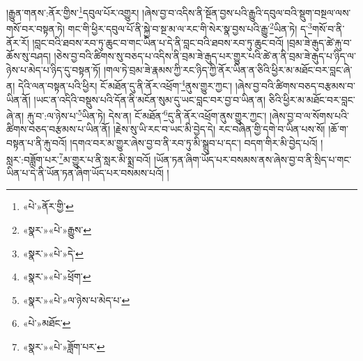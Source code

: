 །རྒྱུན་གནས་:ནོར་གྱིས་\footnote{«པེ་»ནོར་གྱི་}དབུལ་པོར་འགྱུར། །ཞེས་བྱ་བ་འདིས་ནི་སྔོན་བྱས་པའི་རྒྱུའི་དབུལ་བའི་སྡུག་བསྔལ་ལས་གསོ་བར་བསྟན་ཏེ། གང་གི་ཕྱིར་དབུལ་པོ་ནི་སྐྱེ་བ་སྔ་མ་ལ་རང་གི་སེར་སྣ་བྱས་པའི་རྒྱུ་\footnote{«སྣར་»«པེ་»རྒྱུས་}ཡིན་ཏེ། ད་\footnote{«སྣར་»«པེ་»དེ་}གསོ་བ་ནི་ནོར་རོ། །བླང་བའི་ཐབས་རབ་ཏུ་ཆུང་བ་གང་ཡིན་པ་དེ་ནི་བླང་བའི་ཐབས་རབ་ཏུ་ཆུང་བའོ། །བྲམ་ཟེ་རྒུད་ཚེ་རྐུ་བ་ཆོས་སུ་བཤད། །ཅེས་བྱ་བའི་ཚིགས་སུ་བཅད་པ་འདིས་ནི་བྲམ་ཟེ་རྒུད་པར་གྱུར་པའི་ཚེ་ན་ནི་བྲམ་ཟེ་རྒུད་པ་ཉིད་ལ་ཉེས་པ་མེད་པ་ཉིད་དུ་བསྟན་ཏོ། །གལ་ཏེ་བྲམ་ཟེ་རྣམས་ཀྱི་རང་ཉིད་ཀྱི་ནོར་ཡིན་ན་ཅིའི་ཕྱིར་མ་མཐོང་བར་བླང་ཞེ་ན། དེའི་ལན་བསྟན་པའི་ཕྱིར། ངོ་མཐོན་དུ་ནི་ནོར་འཕྲོག་\footnote{«སྣར་»«པེ་»ཕྲོག་}ནུས་གྱུར་ཀྱང་། །ཞེས་བྱ་བའི་ཚིགས་བཅད་བརྩམས་བ་ཡིན་ནོ། །ཡང་ན་འདིའི་བསྡུས་པའི་དོན་ནི་མངོན་སུམ་དུ་ཡང་བླང་བར་བྱ་བ་ཡིན་ན། ཅིའི་ཕྱིར་མ་མཐོང་བར་བླང་ཞེ་ན། རྐུ་བ་:ལ་ཉེས་པ་\footnote{«སྣར་»«པེ་»ལ་ཉེས་པ་མེད་པ་}ཡིན་ཏེ། དེས་ན། ངོ་མཐོན་\footnote{«པེ་»མཐོང་}དུ་ནི་ནོར་འཕྲོག་ནུས་གྱུར་ཀྱང་། །ཞེས་བྱ་བ་ལ་སོགས་པའི་ཚིགས་བཅད་བརྩམས་པ་ཡིན་ནོ། །རྗེས་སུ་ཡི་རང་བ་ཡང་མི་བྱེད་དེ། རང་བཞིན་གྱི་དགེ་བ་ཡིན་པས་སོ། །ཆོ་ག་བསྟན་པ་ནི་རྐུ་བའོ། །དགའ་བར་མ་གྱུར་ཞེས་བྱ་བ་ནི་རབ་ཏུ་མི་སྒྲུབ་པ་དང་། བདག་གིར་མི་བྱེད་པའོ། །སླར་:བཟློག་པར་\footnote{«སྣར་»«པེ་»ཟློག་པར་}མ་གྱུར་པ་ནི་སླར་མི་སྨྲ་བའོ། །ཡོན་ཏན་ཞིག་ཡོད་པར་བསམས་ནས་ཞེས་བྱ་བ་ནི་སྲིད་པ་གང་ཡིན་པ་དེ་ནི་ཡོན་ཏན་ཞིག་ཡོད་པར་བསམས་པའོ། །
